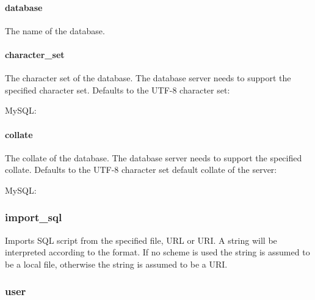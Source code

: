 \paragraph{database}

The name of the database.

\paragraph{character\_set}

The character set of the database. The database server needs to support the
specified character set.
Defaults to the UTF-8 character set:

\begin{compactitem}
\item MySQL: 
\end{compactitem}

\paragraph{collate}

The collate of the database. The database server needs to support the
specified collate. Defaults to the UTF-8 character set default collate of
the server:

\begin{compactitem}
\item MySQL: 
\end{compactitem}

\subsubsection{import\_sql}


Imports SQL script from the specified file, URL or URI. A string will be
interpreted according to the format. If no scheme is used the string
is assumed to be a local file, otherwise the string is assumed to be a URI.

\subsubsection{user}

\\

